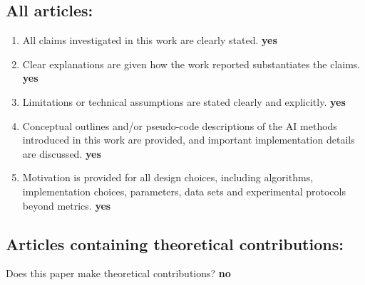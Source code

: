 \documentclass[manuscript, screen, review]{jair}
\begin{document}
\subsection*{All articles:}
\begin{enumerate}
    \item All claims investigated in this work are clearly stated. \textbf{yes}
    \item Clear explanations are given how the work reported substantiates the
      claims. \textbf{yes}
    \item Limitations or technical assumptions are stated clearly and
      explicitly. \textbf{yes}
    \item Conceptual outlines and/or pseudo-code descriptions of the AI methods
      introduced in this work are provided, and important implementation
      details are discussed. \textbf{yes}
    \item Motivation is provided for all design choices, including algorithms,
      implementation choices, parameters, data sets and experimental protocols
      beyond metrics. \textbf{yes}
\end{enumerate}

\subsection*{Articles containing theoretical contributions:}
Does this paper make theoretical contributions? \textbf{no}
\end{document}
